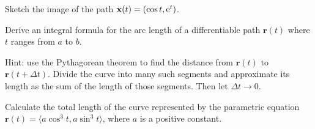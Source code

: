 \documentclass{watsonbook}
\begin{document}
\begin{aexercise}
  Sketch the image of the path $\mathbf{x}(t)=(\cos t, \operatorname{e}^t)$.
\end{aexercise}

\begin{aexercise}
  Derive an integral formula for the arc length of a differentiable
  path $\mathbf{r}(t)$ where $t$ ranges from $a$ to $b$.

  Hint: use the Pythagorean theorem to find the distance from
  $\mathbf{r}(t)$ to $\mathbf{r}(t+\Delta t)$. Divide the curve into
  many such segments and approximate its length as the sum of the
  length of those segments. Then let $\Delta t \to 0$. 
\end{aexercise}

\begin{aexercise}
  Calculate the total length of the curve represented by the
  parametric equation $\mathbf{r}(t) = \langle a\cos^3t, a\sin^3 t \rangle$,
  where $a$ is a positive constant.
\end{aexercise}
\end{document}
